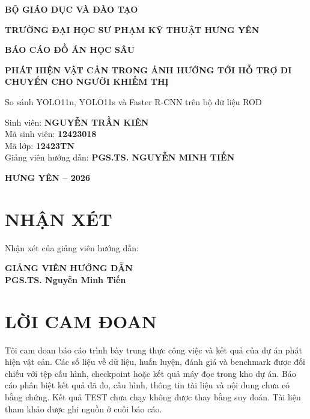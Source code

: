 \documentclass[12pt,a4paper,oneside]{report}
\begin{document}
\begin{titlepage}
\centering
{\bfseries BỘ GIÁO DỤC VÀ ĐÀO TẠO\par}
{\bfseries TRƯỜNG ĐẠI HỌC SƯ PHẠM KỸ THUẬT HƯNG YÊN\par}
\vspace{2.2cm}
{\Large\bfseries BÁO CÁO ĐỒ ÁN HỌC SÂU\par}
\vspace{1.2cm}
{\Large\bfseries PHÁT HIỆN VẬT CẢN TRONG ẢNH HƯỚNG TỚI HỖ TRỢ DI CHUYỂN CHO NGƯỜI KHIẾM THỊ\par}
\vspace{2cm}
{\large So sánh YOLO11n, YOLO11s và Faster R-CNN trên bộ dữ liệu ROD\par}
\vspace{1.5cm}
\begin{flushleft}
Sinh viên: \textbf{NGUYỄN TRẦN KIÊN}\\
Mã sinh viên: \textbf{12423018}\\
Mã lớp: \textbf{12423TN}\\
Giảng viên hướng dẫn: \textbf{PGS.TS. NGUYỄN MINH TIẾN}
\end{flushleft}
\vfill
{\bfseries HƯNG YÊN -- 2026\par}
\end{titlepage}

\chapter*{NHẬN XÉT}
\noindent Nhận xét của giảng viên hướng dẫn:\par
\vspace{8cm}
\begin{flushright}\textbf{GIẢNG VIÊN HƯỚNG DẪN}\\[1.8cm]
\textbf{PGS.TS. Nguyễn Minh Tiến}\end{flushright}

\chapter*{LỜI CAM ĐOAN}
Tôi cam đoan báo cáo trình bày trung thực công việc và kết quả của dự án phát hiện vật cản. Các số liệu về dữ liệu, huấn luyện, đánh giá và benchmark được đối chiếu với tệp cấu hình, checkpoint hoặc kết quả máy đọc trong kho dự án. Báo cáo phân biệt kết quả đã đo, cấu hình, thông tin tài liệu và nội dung chưa có bằng chứng. Kết quả TEST chưa chạy không được thay bằng suy đoán. Tài liệu tham khảo được ghi nguồn ở cuối báo cáo.
\end{document}
